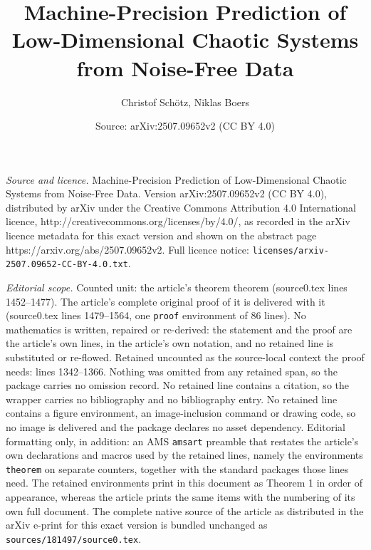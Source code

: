 \documentclass[10pt,a4paper]{amsart}
\title{Machine-Precision Prediction of Low-Dimensional Chaotic Systems from Noise-Free Data}
\author{Christof Sch\"otz, Niklas Boers}
\date{Source: arXiv:2507.09652v2 (CC BY 4.0)}
\begin{document}
\maketitle

\noindent\emph{Source and licence.} Machine-Precision Prediction of Low-Dimensional Chaotic Systems from Noise-Free Data. Version arXiv:2507.09652v2 (CC BY 4.0), distributed by arXiv under the Creative Commons Attribution 4.0 International licence, http://creativecommons.org/licenses/by/4.0/, as recorded in the arXiv licence metadata for this exact version and shown on the abstract page https://arxiv.org/abs/2507.09652v2. Full licence notice: \texttt{licenses/arxiv-2507.09652-CC-BY-4.0.txt}.\par\smallskip

\noindent\textit{Editorial scope.} Counted unit: the article's theorem theorem (source0.tex lines 1452--1477). The article's complete original proof of it is delivered with it (source0.tex lines 1479--1564, one \texttt{proof} environment of 86 lines). No mathematics is written, repaired or re-derived: the statement and the proof are the article's own lines, in the article's own notation, and no retained line is substituted or re-flowed.  Retained uncounted as the source-local context the proof needs: lines 1342--1366.  Nothing was omitted from any retained span, so the package carries no omission record.  No retained line contains a citation, so the wrapper carries no bibliography and no bibliography entry.  No retained line contains a figure environment, an image-inclusion command or drawing code, so no image is delivered and the package declares no asset dependency.  Editorial formatting only, in addition: an AMS \texttt{amsart} preamble that restates the article's own declarations and macros used by the retained lines, namely the environments \texttt{theorem} on separate counters, together with the standard packages those lines need.  The retained environments print in this document as Theorem 1 in order of appearance, whereas the article prints the same items with the numbering of its own full document.  The complete native source of the article as distributed in the arXiv e-print for this exact version is bundled unchanged as \texttt{sources/181497/source0.tex}.
\end{document}
